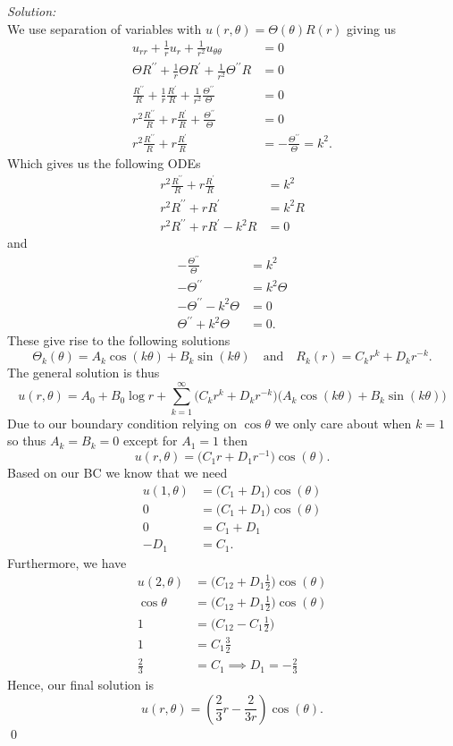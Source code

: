 \documentclass[10pt]{amsart}
\theoremstyle{nonumberplain}
\begin{document}
\begin{enumerate}[label={\bf {\arabic*}:}]
\noindent
\textit{Solution:} \\
We use separation of variables with $u(r, \theta) = \Theta(\theta) R(r)$ giving us
\begin{align*}
u_{rr} + \frac 1 ru_{r} + \frac 1 {r^2} u_{\theta\theta} &= 0 \\
\Theta R^{\prime\prime} + \frac 1 r \Theta R^{\prime} + \frac 1 {r^2} \Theta^{\prime\prime} R &= 0 \\
\frac {R^{\prime\prime}} R + \frac 1 r \frac {R^{\prime}} R + \frac 1 {r^2} \frac{\Theta^{\prime\prime}} \Theta &= 0 \\
r^2 \frac {R^{\prime\prime}} R + r \frac {R^{\prime}} R + \frac{\Theta^{\prime\prime}} \Theta &= 0 \\
r^2 \frac {R^{\prime\prime}} R + r \frac {R^{\prime}} R &= - \frac{\Theta^{\prime\prime}} \Theta = k^2.
\end{align*}
Which gives us the following ODEs
\begin{align*}
r^2 \frac {R^{\prime\prime}} R + r \frac {R^{\prime}} R &= k^2 \\
r^2 R^{\prime\prime} + r R^{\prime} &= k^2R \\
r^2 R^{\prime\prime} + r R^{\prime} - k^2R &= 0
\end{align*}
and
\begin{align*}
- \frac{\Theta^{\prime\prime}} \Theta &= k^2 \\
- \Theta^{\prime\prime} &= k^2 \Theta \\
- \Theta^{\prime\prime} - k^2 \Theta &= 0 \\
\Theta^{\prime\prime} + k^2 \Theta &= 0.
\end{align*}
These give rise to the following solutions
$$
\Theta_k(\theta) = A_k\cos(k\theta) + B_k\sin(k\theta) \quad \text{and} \quad R_k(r) = C_k r^k + D_k r^{-k}.
$$
The general solution is thus
$$
u(r, \theta) = A_0 + B_0 \log r + \sum_{k = 1}^\infty \Big( C_k r^k + D_k r^{-k} \Big)\Big( A_k\cos(k\theta) + B_k\sin(k\theta) \Big)
$$
Due to our boundary condition relying on $\cos \theta$ we only care about when $k = 1$ so thus $A_k = B_k = 0$ except for $A_1 = 1$ then
$$
u(r, \theta) = \big( C_1 r + D_1 r^{-1} \big)\cos(\theta).
$$
Based on our BC we know that we need
\begin{align*}
u(1, \theta) &= \big( C_1 + D_1 \big)\cos(\theta) \\
0 &= \big( C_1 + D_1 \big) \cos(\theta) \\
0 &= C_1 + D_1 \\
-D_1 &= C_1.
\end{align*}
Furthermore, we have
\begin{align*}
u(2, \theta) &= \Big( C_12 + D_1\frac 1 2 \Big)\cos(\theta) \\
\cos \theta &= \Big( C_12 + D_1\frac 1 2 \Big)\cos(\theta) \\
1 &= \Big( C_12 - C_1\frac 1 2 \Big) \\
1 &= C_1 \frac 3 2 \\
\frac 2 3 &= C_1 \implies D_1 = -\frac 2 3
\end{align*}
Hence, our final solution is
$$
u(r, \theta) = \left( \frac 2 3 r -\frac 2 {3r} \right)\cos(\theta).
$$
\qed \\


\end{enumerate}
\end{document}
